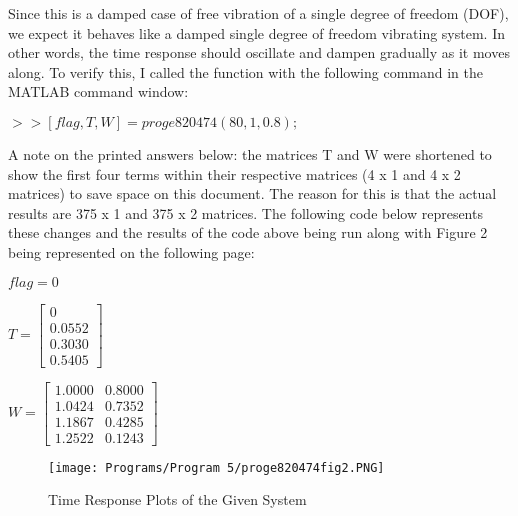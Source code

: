 \documentclass{article}
\begin{document}
{Since this is a damped case of free vibration of a single degree of freedom (DOF), we expect it behaves like a damped single degree of freedom vibrating system.  In other words, the time response should oscillate and dampen gradually as it moves along. To verify this, I called the function with the following command in the MATLAB command window:
\par \medskip \par
$>> [flag, T, W] = proge820474(80,1,0.8);$
\par \medskip \par
A note on the printed answers below: the matrices T and W were shortened to show the first four terms within their respective matrices (4 x 1 and 4 x 2 matrices) to save space on this document.  The reason for this is that the actual results are 375 x 1 and 375 x 2 matrices.  The following code below represents these changes and the results of the code above being run along with Figure 2 being represented on the following page:
\par \medskip \par
$flag = 0$
\par \medskip \par
$T = \begin{bmatrix}
0\\ 
0.0552\\ 
0.3030\\ 
0.5405
\end{bmatrix}$
\par \medskip \par
$W = \begin{bmatrix}
1.0000 & 0.8000\\ 
 1.0424& 0.7352\\ 
 1.1867& 0.4285\\ 
 1.2522& 0.1243
\end{bmatrix}$
\par \medskip \par
 \begin{figure}[!ht]
\centering  %
\texttt{[image: Programs/Program 5/proge820474fig2.PNG]}
 \caption{Time Response Plots of the Given System}
 \label{f:Graph 2}
\end{figure}
\par \medskip
\par \bigskip \par
\par \bigskip \par
\par \bigskip \par
}
\end{document}
